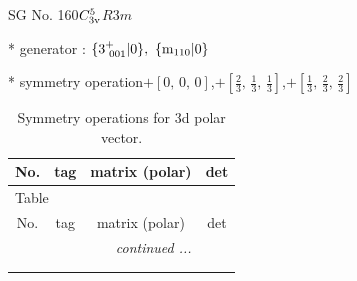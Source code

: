 \documentclass[fleqn,8pt]{jsarticle}
\begin{document}
\setcounter{MaxMatrixCols}{32}

\renewcommand{\tablename}{Table~}
\renewcommand{\figurename}{Figure~}
\begin{center}
\LARGE
SG No. 160\quad$C_{\rm 3v}^{5}$\quad$R3m$\quad[ trigonal ]
\end{center}

* generator : $\{3^{+}_{\,\,001}|0\},\,\,\{{\rm m}_{110}|0\}$

* symmetry operation\quad$+\left[ 0,\, 0,\, 0 \right]$,\quad $+\left[ \frac{2}{3},\, \frac{1}{3},\, \frac{1}{3} \right]$,\quad $+\left[ \frac{1}{3},\, \frac{2}{3},\, \frac{2}{3} \right]$
\renewcommand{\arraystretch}{1.3}
\begin{longtable}{cccc}
\caption{Symmetry operations for 3d polar vector.}
 \\
 \hline \hline
No. & tag & matrix (polar) & det \\ \hline \endfirsthead

\multicolumn{3}{l}{\tablename\ \thetable{}} \\
 \hline \hline
No. & tag & matrix (polar) & det \\ \hline \endhead

 \hline \hline
\multicolumn{3}{r}{\footnotesize\it continued ...} \\ \endfoot

 \hline \hline
\multicolumn{3}{r}{} \\ \endlastfoot


\end{longtable}
\end{document}
